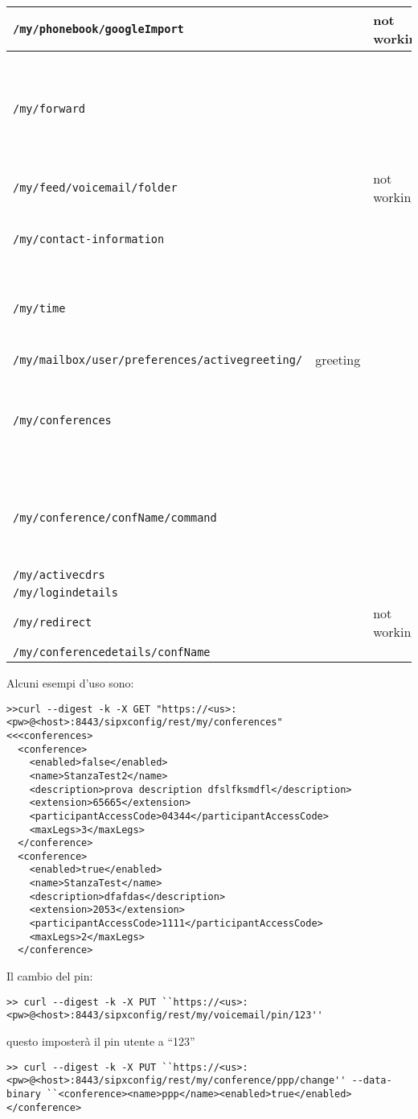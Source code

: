 \begin{tabular}[c]{ l | c || l || p{5cm}}
\texttt{/my/phonebook/googleImport} & & not working &  \\ \hline
\texttt{/my/forward} & & & Recupera i dettagli relativi al Call forwarding dell'utente \\ \hline
\texttt{/my/feed/voicemail/{folder}} & & not working & \\ \hline
\texttt{/my/contact-information} & & & Recupera le informazioin dell'utente \\ \hline
\texttt{/my/time} & & & Recupera data e ora del server host \\ \hline
\texttt{/my/mailbox/{user}/preferences/activegreeting/} & {greeting} & & \\ \hline
\texttt{/my/conferences} & & & elenca tutte le conferenze associate all'utente \\ \hline
\texttt{/my/conference/{confName}/{command}} & & & esegue un comando per la conferenza dell'utente\\ \hline
\texttt{/my/activecdrs} & & & \\ \hline
\texttt{/my/logindetails} & & & \\ \hline
\texttt{/my/redirect} & &not working & \\ \hline
\texttt{/my/conferencedetails/{confName}} & & & \\ \hline
\end{tabular}

\bigskip
Alcuni esempi d'uso sono:
\bigskip

\begin{lstlisting}
>>curl --digest -k -X GET "https://<us>:<pw>@<host>:8443/sipxconfig/rest/my/conferences"
<<<conferences>
  <conference>
    <enabled>false</enabled>
    <name>StanzaTest2</name>
    <description>prova description dfslfksmdfl</description>
    <extension>65665</extension>
    <participantAccessCode>04344</participantAccessCode>
    <maxLegs>3</maxLegs>
  </conference>
  <conference>
    <enabled>true</enabled>
    <name>StanzaTest</name>
    <description>dfafdas</description>
    <extension>2053</extension>
    <participantAccessCode>1111</participantAccessCode>
    <maxLegs>2</maxLegs>
  </conference>
\end{lstlisting}
\bigskip

Il cambio del pin:
\bigskip
\begin{lstlisting}
>> curl --digest -k -X PUT ``https://<us>:<pw>@<host>:8443/sipxconfig/rest/my/voicemail/pin/123''
\end{lstlisting}
\bigskip

questo imposter\`a il pin utente a ``123''
\bigskip
\begin{lstlisting}
>> curl --digest -k -X PUT ``https://<us>:<pw>@<host>:8443/sipxconfig/rest/my/conference/ppp/change'' --data-binary ``<conference><name>ppp</name><enabled>true</enabled></conference>
\end{lstlisting}


